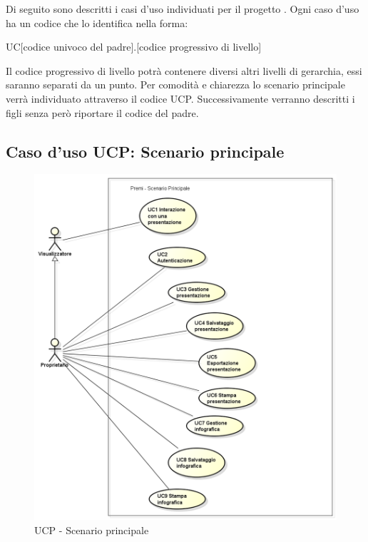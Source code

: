 Di seguito sono descritti i casi d'uso individuati per il progetto \PROGETTO. Ogni caso d'uso ha un codice che lo identifica nella forma:
\begin{center}
	UC[codice univoco del padre].[codice progressivo di livello]
\end{center}
Il codice progressivo di livello potrà contenere diversi altri livelli di gerarchia, essi saranno separati da un punto. Per comodità e chiarezza lo scenario principale verrà individuato attraverso il codice UCP. Successivamente verranno descritti i figli senza però riportare il codice del padre.

\subsection{Caso d'uso UCP: Scenario principale}
\begin{figure}[h] 
	\centering 
	\includegraphics[scale=0.5] {img/UCP.png} 
	\caption{UCP - Scenario principale} 
\end{figure}

\newpage

